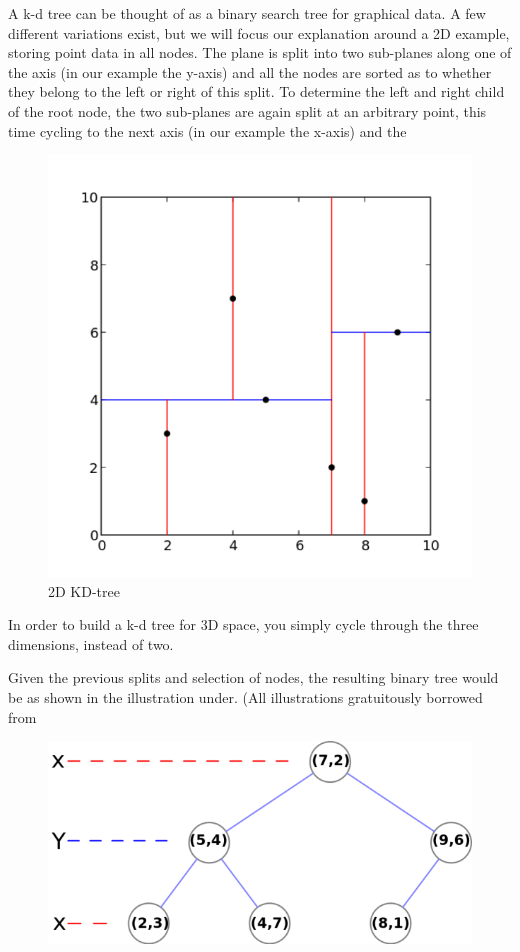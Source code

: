 \begin{enumerate}
\begin{enumerate}
A k-d tree can be thought of as a binary search tree for graphical data. A few different variations exist, but we will focus our explanation around a 2D example, storing point data in all nodes. The plane is split into two sub-planes along one of the axis (in our example the y-axis) and all the nodes are sorted as to whether they belong to the left or right of this split. To determine the left and right child of the root node, the two sub-planes are again split at an arbitrary point, this time cycling to the next axis (in our example the x-axis) and the

\begin{figure}[ht!]
\centering
\includegraphics[width=120mm]{gfx/Kdtree_2d.png}

\caption{2D KD-tree}
\label{fig:kdtree_2d}
\end{figure}

In order to build a k-d tree for 3D space, you simply cycle through the three dimensions, instead of two.

Given the previous splits and selection of nodes, the resulting binary tree would be as shown in the illustration under. (All illustrations gratuitously borrowed from 

\begin{figure}[ht!]
\centering
\includegraphics[width=120mm]{gfx/Tree_0001.png}


\end{figure}
\end{enumerate}
\end{enumerate}
